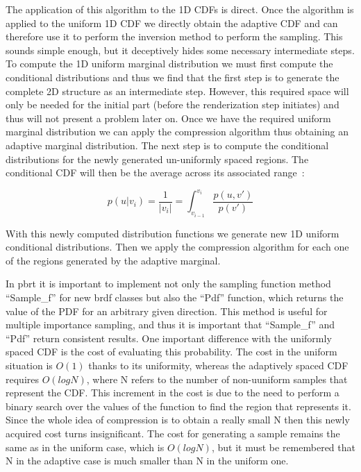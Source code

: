 \documentclass[conference]{acmsiggraph}
\begin{document}
The application of this algorithm to the 1D CDFs is direct. Once the algorithm is applied to the uniform 1D CDF we directly obtain the adaptive CDF and can therefore use it to perform the inversion method to perform the sampling. This sounds simple enough, but it deceptively hides some necessary intermediate steps. To compute the 1D uniform marginal distribution we must first compute the conditional distributions and thus we find that the first step is to generate the complete 2D structure as an intermediate step. However, this required space will only be needed for the initial part (before the renderization step initiates) and thus will not present a problem later on. Once we have the required uniform marginal distribution we can apply the compression algorithm thus obtaining an adaptive marginal distribution. The next step is to compute the conditional distributions for the newly generated un-uniformly spaced regions. The conditional CDF will then be the average across its associated range~\cite{Lawrence:2005:ANC}:

\begin{equation}
 p(u|v_{i}) = \frac{1}{|v_{i}|} = \int_{v_{i-1}}^{v_{i}}\frac{p(u, v')}{p(v')}
 \end{equation}

With this newly computed distribution functions we generate new 1D uniform conditional distributions. Then we apply the compression algorithm for each one of the regions generated by the adaptive marginal. 

In pbrt it is important to implement not only the sampling function method “Sample\_f” for new brdf classes but also the “Pdf” function, which returns the value of the PDF for an arbitrary given direction. This method is useful for multiple importance sampling, and thus it is important that “Sample\_f” and “Pdf” return consistent results. One important difference with the uniformly spaced CDF is the cost of evaluating this probability. The cost in the uniform situation is $O(1)$ thanks to its uniformity, whereas the adaptively spaced CDF requires $O(log N)$, where N refers to the number of non-uuniform samples that represent the CDF. This increment in the cost is due to the need to perform a binary search over the values of the function to find the region that represents it. Since the whole idea of compression is to obtain a really small N then this newly acquired cost turns insignificant.  The cost for generating a sample remains the same as in the uniform case, which is $O(log N)$, but it must be remembered that N in the adaptive case is much smaller than N in the uniform one. 
\end{document}
